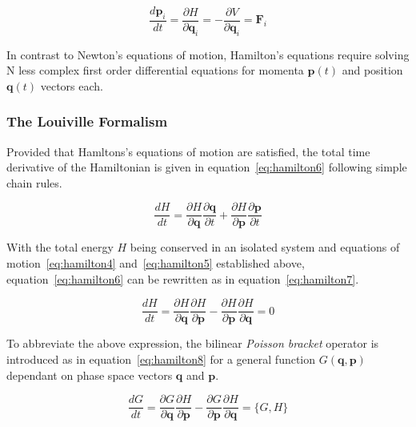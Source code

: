 \documentclass[12pt]{article}
\begin{document}
\begin{equation}
  \frac{d\textbf{p}_i}{dt} = \frac{\partial H}{\partial \textbf{q}_i}= - \frac{\partial V}{\partial \textbf{q}_i}= \textbf{F}_i
  \label{eq:hamilton5}
\end{equation}

\bigskip

\noindent In contrast to Newton's equations of motion, Hamilton's equations require solving N less complex first order differential equations for momenta $\mathbf{p}(t)$ and position $\mathbf{q}(t)$ vectors each.

\subsubsection{The Louiville Formalism}

\noindent Provided that Hamltons's equations of motion are satisfied, the total time derivative of the Hamiltonian is given in equation~\ref{eq:hamilton6} following simple chain rules.

\begin{equation}
  \frac{dH}{dt} = \frac{\partial H}{\partial \textbf{q}} \frac{\partial \textbf{q}}{\partial t} + \frac{\partial H}{\partial \textbf{p}} \frac{\partial \textbf{p}}{\partial t}
  \label{eq:hamilton6}
\end{equation}

\bigskip

\noindent With the total energy $H$ being conserved in an isolated system and equations of motion~\ref{eq:hamilton4} and~\ref{eq:hamilton5} established above, equation~\ref{eq:hamilton6} can be rewritten as in equation~\ref{eq:hamilton7}.

\begin{equation}
  \frac{dH}{dt} = \frac{\partial H}{\partial \textbf{q}} \frac{\partial H}{\partial \textbf{p}} - \frac{\partial H}{\partial \textbf{p}} \frac{\partial H}{\partial \textbf{q}} = 0
  \label{eq:hamilton7}
\end{equation}

\bigskip

\noindent To abbreviate the above expression, the bilinear \textit{Poisson bracket} operator is introduced as in equation~\ref{eq:hamilton8} for a general function $G(\textbf{q}, \textbf{p})$ dependant on phase space vectors $\textbf{q}$ and $\textbf{p}$.

\begin{equation}
  \frac{dG}{dt} = \frac{\partial G}{\partial \textbf{q}} \frac{\partial H}{\partial \textbf{p}} - \frac{\partial G}{\partial \textbf{p}} \frac{\partial H}{\partial \textbf{q}} = \{G, H\}
  \label{eq:hamilton8}
\end{equation}
\end{document}
